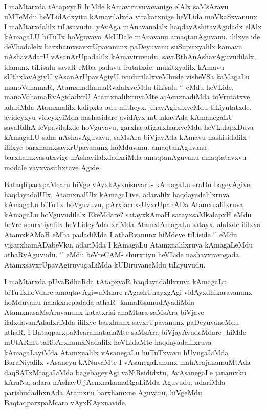 \begin{artha}
I maMtarxda tAtapxyaR hiMde kAmaviruvuvavanige elAlx saMsAravu uMTeMdu heVLidAdxyitu kAmavilalxda virakatxnige heVLida moVkaSxvanunx I maMtarxdalilx tiLisuvudu. yAvAga mAnavanalalx haqdayAshitavAgidadx elAlx kAmagaLU biTuTx hoVguvavo AkUDale mAnavanu amaqtanAguvanu. ililxye ide deVhadalelx barxhamxsavxrUpavanunx paDeyuvanu suSupitxyalilx kamavu nAshavAdarU vAsanArUpadalilx kAmaviruvudu, savaRthAnAshavAguvudilalx, idanunx tiLisalu savaR eMba padavu irutatxde. mukitxyalilx kAmavu sUthxlavAgiyU vAsanArUpavAgiyU ivudurilalxveMbude visheVSa kaMagaLu manoVdhamaR, AtamxnadhamaRvalalxveMdu tiLisalu `\stext' eMdu heVLide, manoVdhamaRvAgidadxrU AtamxnalilxruvaMte ajAcnxnadiMda toVrutatxve, adariMda Atamxnalilx kalipxta adu mitheyx, jinavAgilalxveMdu tiLiyutatxde. avideyxyu videyxyiMda nashasidare avidAyx mUlakavAda kAmanegaLU savaRdhA leVpavilalxde hoVguvavu, garxha atigarxharxveMdu heVLalapxDuva kAmagaLU saha nAshavAguvavu, saMsAra biVjavAda kAmavu nashisidalilx ililxye barxhamxsavxrUpavanunx hoMduvanu. amaqtanAguvanu barxhamxvasutxvige nAshavilalxdadxriMda amaqtanAguvanu amaqtatavxvu modale vayxvasithxtave Agide.
\end{artha}

\begin{artha}
BataqRparxpaMcaru hiVge vAyxkAyxnisuvaru- kAmagaLu eraDu bageyAgive. haqdayadalUlx, AtamxnalUlx kAmagaLive. adaralilx haqdayadalilxruva kAmagaLu biTuTx hoVguvuvu, pArxjacnxsUvxrUpanADa Atamxnalilxruva kAmagaLu hoVguvudilalx EkeMdare? satayxkAmaH satayxsaMkalapxH eMdu beVre shurxtiyalilx heVLideyAdadxriMda AtamxlAmagaLu satayx. alalxde ililxya AtamxkAMaH eMba padadiMda I athaRvanunx hiMdeye tiLiside `\stext' eMdu vigarxhamADabeVku, adariMda I kAmagaLu Atamxnalilxruva kAmagaLeMdu athaRvAguvudu. `\stext' eMdu beVreCAM- shurxtiyu heVLide nashavxravagada AtamxsavxrUpavAgiruvugaLiMda kUDiruvaneMdu tiLiyuvudu.

I maMtarxda pUvaRdhaRda tAtapxyaR haqdayadalilxruva kAmagaLu biTuTxhoVdare amaqtavAgi=aMdare rAgashUnayxgAgi vidAyxdhikaravanunx hoMduvanu nalakxnepadada athaR- kamaRsamudAyadiMda AtamxnasaMsAravanunx katatxrisi anaMtara saMsAra biVjave ilalxdavanAdadxriMda ililxye barxhamx savxrUpavanunx paDeyuvaneMdu athaR, I BataqparxpaMcaramatadaMte saMsAra biVjayAvudeMdare- hiMde mUtARmUtaRbArxhamxNadalilx heVLidaMte haqdayadalilxruva kAmagaLayiMda Atamxnalilx vAsanegaLu huTuTxvavu hUvugaLiMda BaraNiyalilx vAsaneyu kANuvaMte I vAsanegaLanunx mahArajanamuMtAda daqSATxMtagaLiMda bagebageyAgi vaNiRsididxtu, AvAsanegaLe janamxku kAraNa, adara nAshavU jAcnxnakamaRgaLiMda Aguvudu, adariMda parishudadhxnAda Atamxnu barxhamxne Aguvanu, hiVgeMdu BaqtaqparxpaMcara vAyxKAyxnavide.
\end{artha}

